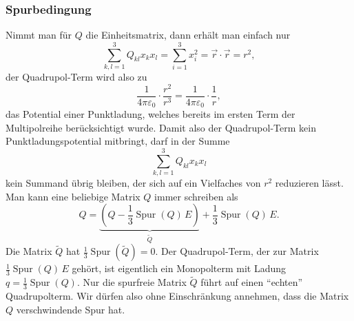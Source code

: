 \subsubsection{Spurbedingung}
Nimmt man für $Q$ die Einheitsmatrix, dann erhält man einfach nur
\[
\sum_{k,l=1}^3 Q_{kl}x_kx_l=\sum_{i=1}^3 x_i^2 = \vec{r}\cdot\vec{r}=r^2,
\]
der Quadrupol-Term wird also  zu
\[
\frac1{4\pi\varepsilon_0}\cdot\frac{r^2}{r^3}
=
\frac1{4\pi\varepsilon_0}\cdot\frac{1}{r},
\]
das Potential einer Punktladung, welches bereits im ersten Term
der Multipolreihe berücksichtigt wurde.
Damit also der Quadrupol-Term kein Punktladungspotential mitbringt,
darf in der Summe
\[
\sum_{k,l=1}^3Q_{kl}x_kx_l
\]
kein Summand übrig bleiben, der sich auf ein Vielfaches von $r^2$ 
reduzieren lässt.
Man kann eine beliebige Matrix $Q$ immer schreiben als
\[
Q = \underbrace{(Q - {\textstyle \frac13}\operatorname{Spur}(Q)\, E)}_{\displaystyle \tilde Q} + {\textstyle\frac13}\operatorname{Spur} (Q)\, E.
\]
Die Matrix $\tilde Q$ hat $\frac13\operatorname{Spur}(\tilde Q)=0$.
Der Quadrupol-Term, der zur Matrix $\frac13\operatorname{Spur}(Q)\,E$ gehört,
ist eigentlich ein Monopolterm mit Ladung $q=\frac13\operatorname{Spur}(Q)$.
Nur die spurfreie Matrix $\tilde Q$ führt auf einen ``echten'' Quadrupolterm.
Wir dürfen also ohne Einschränkung annehmen, dass die Matrix $Q$ verschwindende
Spur hat.

